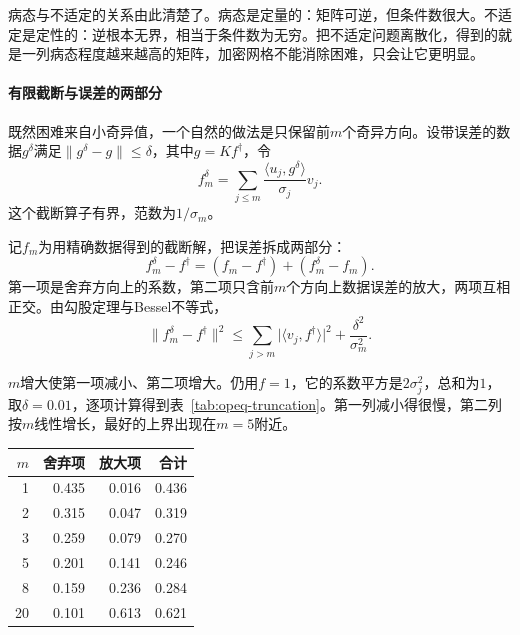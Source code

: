 病态与不适定的关系由此清楚了。病态是定量的：矩阵可逆，但条件数很大。不适定是定性的：逆根本无界，相当于条件数为无穷。把不适定问题离散化，得到的就是一列病态程度越来越高的矩阵，加密网格不能消除困难，只会让它更明显。

\paragraph{有限截断与误差的两部分}
既然困难来自小奇异值，一个自然的做法是只保留前$m$个奇异方向。设带误差的数据$g^\delta$满足$\lVert g^\delta-g\rVert\leq\delta$，其中$g=Kf^\dagger$，令
\[
  f_m^\delta=\sum_{j\leq m}\frac{\langle u_j,g^\delta\rangle}{\sigma_j}v_j.
\]
这个截断算子有界，范数为$1/\sigma_m$。

记$f_m$为用精确数据得到的截断解，把误差拆成两部分：
\[
  f_m^\delta-f^\dagger=(f_m-f^\dagger)+(f_m^\delta-f_m).
\]
第一项是舍弃方向上的系数，第二项只含前$m$个方向上数据误差的放大，两项互相正交。由勾股定理与Bessel不等式，
\begin{equation}
  \lVert f_m^\delta-f^\dagger\rVert^2
  \leq\sum_{j>m}\lvert\langle v_j,f^\dagger\rangle\rvert^2
  +\frac{\delta^2}{\sigma_m^2}.
  \label{eq:opeq-truncation-split}
\end{equation}

$m$增大使第一项减小、第二项增大。仍用$f=1$，它的系数平方是$2\sigma_j^2$，总和为$1$，取$\delta=0.01$，逐项计算得到表~\ref{tab:opeq-truncation}。第一列减小得很慢，第二列按$m$线性增长，最好的上界出现在$m=5$附近。

\begin{BookInlineTable}
  \centering
  \caption{$Vf=g$截断解的误差上界（$f=1$，$\delta=0.01$）。舍弃项为$(\sum_{j>m}2\sigma_j^2)^{1/2}$，放大项为$\delta/\sigma_m$，合计项按式~\eqref{eq:opeq-truncation-split}取两者平方和的平方根。}
  \label{tab:opeq-truncation}
  \begin{tabular}{rrrr}
    \toprule
    $m$ & 舍弃项 & 放大项 & 合计 \\
    \midrule
    1 & 0.435 & 0.016 & 0.436 \\
    2 & 0.315 & 0.047 & 0.319 \\
    3 & 0.259 & 0.079 & 0.270 \\
    5 & 0.201 & 0.141 & 0.246 \\
    8 & 0.159 & 0.236 & 0.284 \\
    20 & 0.101 & 0.613 & 0.621 \\
    \bottomrule
  \end{tabular}
\end{BookInlineTable}

